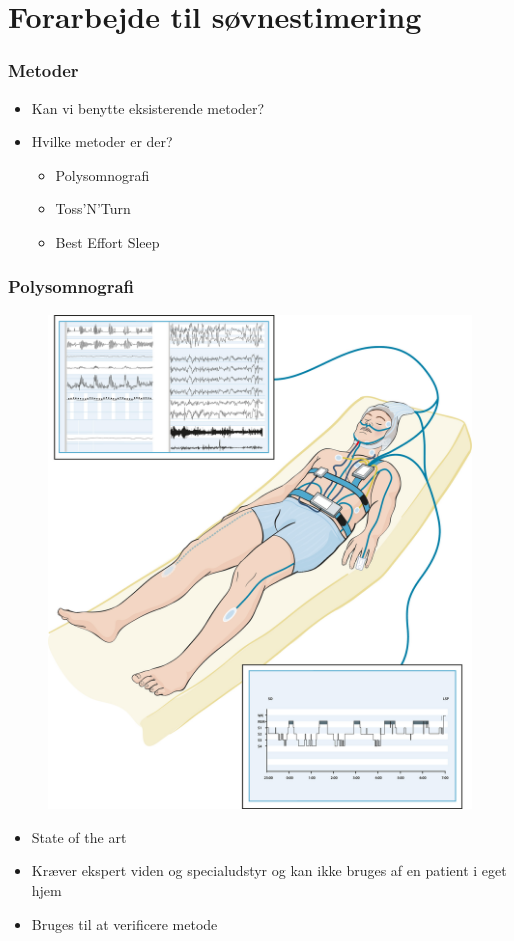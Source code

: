 \section{Forarbejde til søvnestimering}
\begin{frame}
\frametitle{Metoder}
	\begin{itemize}
	\item Kan vi benytte eksisterende metoder?
	\item Hvilke metoder er der?
	{\begin{itemize}
		\item Polysomnografi
		\item Toss'N'Turn
		\item Best Effort Sleep
		 \end{itemize}}
	\end{itemize}
\end{frame}

\begin{frame}
\frametitle{Polysomnografi}
\begin{figure}
	\includegraphics[scale=0.05]{polysomnografi}
\end{figure}

\begin{itemize}
	\item State of the art
	\item Kræver ekspert viden og specialudstyr og kan ikke bruges af en patient i eget hjem
	\item Bruges til at verificere metode
\end{itemize}
\end{frame}

